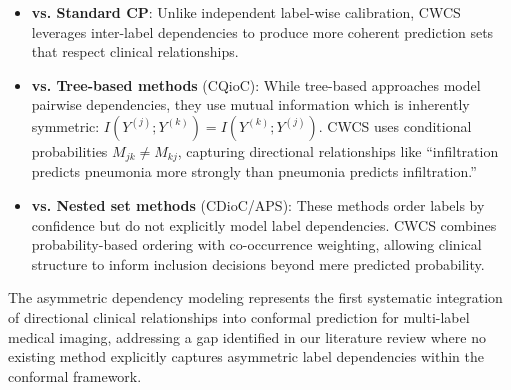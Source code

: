\begin{itemize}
\item \textbf{vs. Standard CP}: Unlike independent label-wise calibration, CWCS leverages inter-label dependencies to produce more coherent prediction sets that respect clinical relationships.

\item \textbf{vs. Tree-based methods} (CQioC): While tree-based approaches model pairwise dependencies, they use mutual information which is inherently symmetric: $I(Y^{(j)}; Y^{(k)}) = I(Y^{(k)}; Y^{(j)})$. CWCS uses conditional probabilities $M_{jk} \neq M_{kj}$, capturing directional relationships like ``infiltration predicts pneumonia more strongly than pneumonia predicts infiltration.''

\item \textbf{vs. Nested set methods} (CDioC/APS): These methods order labels by confidence but do not explicitly model label dependencies. CWCS combines probability-based ordering with co-occurrence weighting, allowing clinical structure to inform inclusion decisions beyond mere predicted probability.
\end{itemize}

The asymmetric dependency modeling represents the first systematic integration of directional clinical relationships into conformal prediction for multi-label medical imaging, addressing a gap identified in our literature review where no existing method explicitly captures asymmetric label dependencies within the conformal framework.

